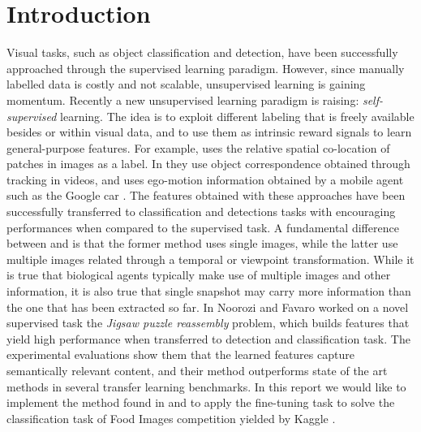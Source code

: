 \section{Introduction}
Visual tasks, such as object classification and detection, have been successfully approached through the supervised learning paradigm. However, since manually labelled data is costly and not scalable, unsupervised learning is gaining momentum.\newline
Recently a new unsupervised learning paradigm is raising: \emph{self-supervised} learning. The idea is to exploit different labeling that is freely available besides or within visual data, and to use them as intrinsic reward signals to learn general-purpose features.
For example, \cite{context_prediction} uses the relative spatial co-location of patches in images as a label. In \cite{unsupervised_models_recognition} they use object correspondence obtained through tracking in videos, and \cite{learning_by_moving} uses ego-motion information obtained by a mobile agent such as the Google car \cite{landmark_identification}. The features obtained with these approaches have been successfully transferred to classification and detections tasks with encouraging performances when compared to the supervised task.\newline
A fundamental difference between \cite{context_prediction} and \cite{unsupervised_models_recognition} is that the former method uses single images, while the latter use multiple images related through a temporal or viewpoint transformation. While it is true that biological agents typically make use of multiple images and other information, it is also true that single snapshot may carry more information than the one that has been extracted so far. In \cite{Noroozi_2016} Noorozi and Favaro worked on a novel supervised task the \emph{Jigsaw puzzle reassembly} problem, which builds features that yield high performance when transferred to detection and classification task. The experimental evaluations show them that the learned features capture semantically relevant content, and their method outperforms state of the art methods in several transfer learning benchmarks.\newline
In this report we would like to implement the method found in \cite{Noroozi_2016} and to apply the fine-tuning task to solve the classification task of Food Images \cite{food_images} competition yielded by Kaggle \cite{kaggle}. 


